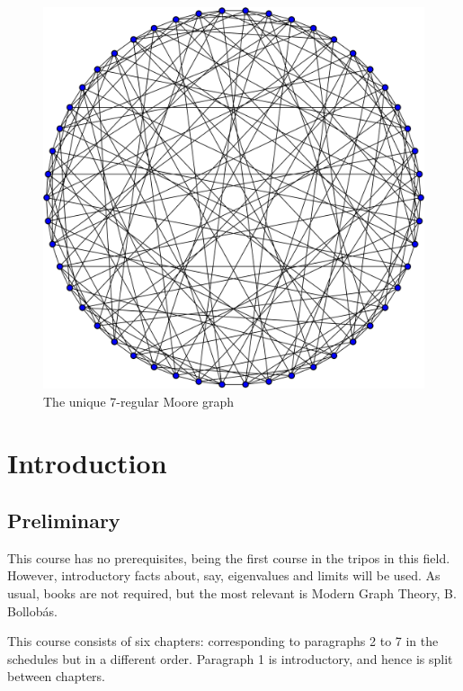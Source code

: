 \documentclass{article}
\begin{document}
\maketitle

\tableofcontents

\vspace{20mm}
\begin{figure}[h]
    \centering
    \includegraphics[scale=0.15]{hoffman_singleton}
    \caption*{The unique 7-regular Moore graph}
    \label{fig:hsgraph}
\end{figure}
\clearpage
\section{Introduction}

\subsection{Preliminary}
This course has no prerequisites, being the first course in the tripos in this field.  However, introductory facts about, say, eigenvalues and limits will be used.
As usual, books are not required, but the most relevant is Modern Graph Theory, B. Bollob\'as.

This course consists of six chapters: corresponding to paragraphs 2 to 7 in the schedules but in a different order. Paragraph 1 is introductory, and hence is split between chapters.
\end{document}
